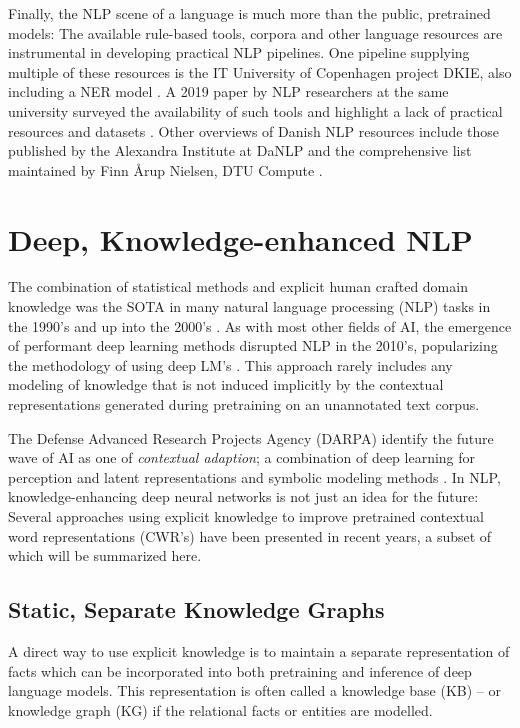 \documentclass[main.tex]{subfiles}
\begin{document}
Finally, the NLP scene of a language is much more than the public, pretrained models:
The available rule-based tools, corpora and other language resources are instrumental in developing practical NLP pipelines.
One pipeline supplying multiple of these resources is the IT University of Copenhagen project DKIE, also including a NER model \cite{derc2014dkie}.
A 2019 paper by NLP researchers at the same university surveyed the availability of such tools and highlight a lack of practical resources and datasets \cite{kirkedal2019lacunae}.
Other overviews of Danish NLP resources include those published by the Alexandra Institute at DaNLP \cite{danlp2021} and the comprehensive list maintained by Finn Årup Nielsen, DTU Compute \cite{arup21awesome}.

\section{Deep, Knowledge-enhanced NLP}
The combination of statistical methods and explicit human crafted domain knowledge was the SOTA in many natural language processing (NLP) tasks in the 1990's and up into the 2000's \cite[Sec. 22.5]{russell2016ai}.
As with most other fields of AI, the emergence of performant deep learning methods disrupted NLP in the 2010's, popularizing the methodology of using deep LM's \cite{otter18dlnlp}.
This approach rarely includes any modeling of knowledge that is not induced implicitly by the contextual representations generated during pretraining on an unannotated text corpus.

The Defense Advanced Research Projects Agency (DARPA) identify the future wave of AI as one of \emph{contextual adaption}; a combination of deep learning for perception and latent representations and symbolic modeling methods \cite{darpa17ai}.
In NLP, knowledge-enhancing deep neural networks is not just an idea for the future:
Several approaches using explicit knowledge to improve pretrained contextual word representations (CWR's) have been presented in recent years, a subset of which will be summarized here.

\subsection{Static, Separate Knowledge Graphs}
A direct way to use explicit knowledge is to maintain a separate representation of facts which can be incorporated into both pretraining and inference of deep language models.
This representation is often called a knowledge base (KB)  -- or knowledge graph (KG) if the relational facts or entities are modelled.
\end{document}
